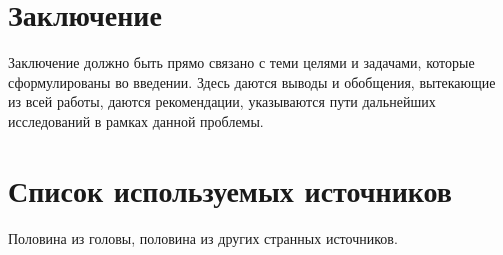 \section{Заключение}
	Заключение должно быть прямо связано с теми целями и задачами, которые
	сформулированы во введении. Здесь даются выводы и обобщения, вытекающие из всей 
	работы, даются рекомендации, указываются пути дальнейших исследований в рамках
	данной проблемы.

\section{Список используемых источников}
	Половина из головы, половина из других странных источников.

 
